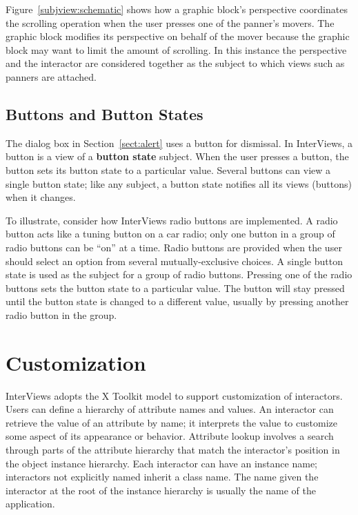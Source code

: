 Figure~\ref{subjview:schematic} shows how a graphic block's
perspective coordinates the scrolling operation when the user presses
one of the panner's movers.  The graphic block modifies its
perspective on behalf of the mover because the graphic block may want
to limit the amount of scrolling.  In this instance
the perspective and the
interactor are considered together as the subject to which
views such as panners are attached.

    \subsection{Buttons and Button States}

The dialog box in Section~\ref{sect:alert} uses a
button for dismissal.  In InterViews, a
button is a view of a {\bf button state} subject.
When the user presses a button, the button sets its button state to a
particular value.  Several buttons can view a single button state;
like any subject, a button state notifies all
its views (buttons) when it changes.

To illustrate, consider how InterViews radio buttons are implemented.
A radio button acts like a tuning button on a car radio; only one
button in a group of radio buttons can be ``on'' at a time.  Radio
buttons are provided when the user should select an option from
several
mutually-exclusive choices.  A single button state is used as the
subject for a group of radio buttons.  Pressing one of the radio
buttons sets the button state to a particular value.  The button will
stay pressed until the button state is changed to a different value,
usually by pressing another radio button in the group.

\section{Customization}

InterViews adopts the X Toolkit \cite{xt:intrinsics} model to support
customization of interactors.  Users can define a hierarchy of
attribute names and values.  An interactor can retrieve the value of
an attribute by name; it interprets the value to customize some aspect
of its appearance or behavior.  Attribute lookup involves a search
through parts of the attribute hierarchy that match the interactor's
position in the object instance hierarchy.  Each interactor can have
an instance name; interactors not explicitly named inherit a class
name.  The name given the interactor at the root of the
instance hierarchy is usually the name of the application.


